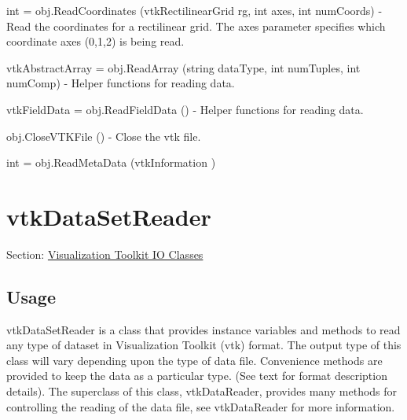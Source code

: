 \begin{DoxyItemize}
\item {\ttfamily int = obj.\-Read\-Coordinates (vtk\-Rectilinear\-Grid rg, int axes, int num\-Coords)} -\/ Read the coordinates for a rectilinear grid. The axes parameter specifies which coordinate axes (0,1,2) is being read.  
\item {\ttfamily vtk\-Abstract\-Array = obj.\-Read\-Array (string data\-Type, int num\-Tuples, int num\-Comp)} -\/ Helper functions for reading data.  
\item {\ttfamily vtk\-Field\-Data = obj.\-Read\-Field\-Data ()} -\/ Helper functions for reading data.  
\item {\ttfamily obj.\-Close\-V\-T\-K\-File ()} -\/ Close the vtk file.  
\item {\ttfamily int = obj.\-Read\-Meta\-Data (vtk\-Information )}  
\end{DoxyItemize}\hypertarget{vtkio_vtkdatasetreader}{}\section{vtk\-Data\-Set\-Reader}\label{vtkio_vtkdatasetreader}
Section\-: \hyperlink{sec_vtkio}{Visualization Toolkit I\-O Classes} \hypertarget{vtkwidgets_vtkxyplotwidget_Usage}{}\subsection{Usage}\label{vtkwidgets_vtkxyplotwidget_Usage}
vtk\-Data\-Set\-Reader is a class that provides instance variables and methods to read any type of dataset in Visualization Toolkit (vtk) format. The output type of this class will vary depending upon the type of data file. Convenience methods are provided to keep the data as a particular type. (See text for format description details). The superclass of this class, vtk\-Data\-Reader, provides many methods for controlling the reading of the data file, see vtk\-Data\-Reader for more information.

